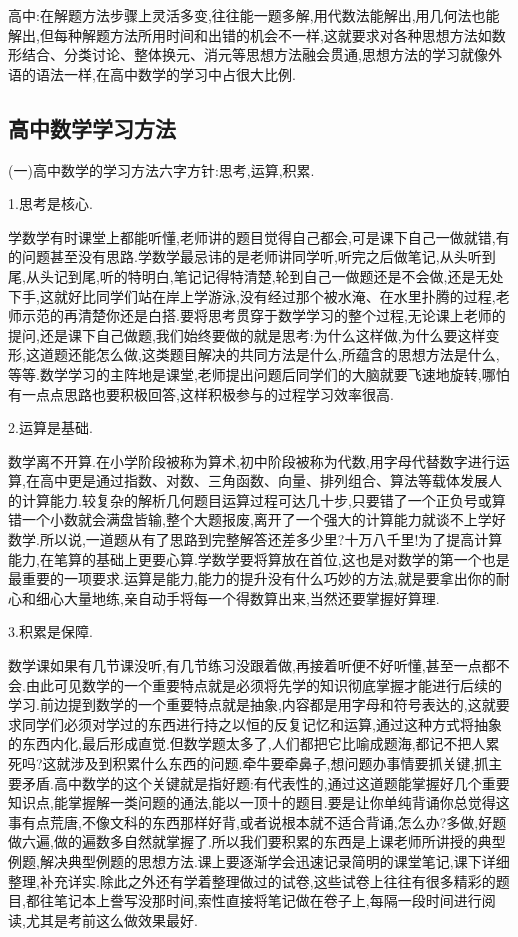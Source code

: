 高中:在解题方法步骤上灵活多变,往往能一题多解,用代数法能解出,用几何法也能解出,但每种解题方法所用时间和出错的机会不一样,这就要求对各种思想方法如数形结合、分类讨论、整体换元、消元等思想方法融会贯通,思想方法的学习就像外语的语法一样,在高中数学的学习中占很大比例.

\subsection{高中数学学习方法}
(一)高中数学的学习方法六字方针:思考,运算,积累.

1.思考是核心.

学数学有时课堂上都能听懂,老师讲的题目觉得自己都会,可是课下自己一做就错,有的问题甚至没有思路.学数学最忌讳的是老师讲同学听,听完之后做笔记,从头听到尾,从头记到尾,听的特明白,笔记记得特清楚,轮到自己一做题还是不会做,还是无处下手,这就好比同学们站在岸上学游泳,没有经过那个被水淹、在水里扑腾的过程,老师示范的再清楚你还是白搭.要将思考贯穿于数学学习的整个过程,无论课上老师的提问,还是课下自己做题,我们始终要做的就是思考:为什么这样做,为什么要这样变形,这道题还能怎么做,这类题目解决的共同方法是什么,所蕴含的思想方法是什么,等等.数学学习的主阵地是课堂,老师提出问题后同学们的大脑就要飞速地旋转,哪怕有一点点思路也要积极回答,这样积极参与的过程学习效率很高.

2.运算是基础.

数学离不开算.在小学阶段被称为算术,初中阶段被称为代数,用字母代替数字进行运算,在高中更是通过指数、对数、三角函数、向量、排列组合、算法等载体发展人的计算能力.较复杂的解析几何题目运算过程可达几十步,只要错了一个正负号或算错一个小数就会满盘皆输,整个大题报废,离开了一个强大的计算能力就谈不上学好数学.所以说,一道题从有了思路到完整解答还差多少里?十万八千里!为了提高计算能力,在笔算的基础上更要心算.学数学要将算放在首位,这也是对数学的第一个也是最重要的一项要求.运算是能力,能力的提升没有什么巧妙的方法,就是要拿出你的耐心和细心大量地练,亲自动手将每一个得数算出来,当然还要掌握好算理.

3.积累是保障.

数学课如果有几节课没听,有几节练习没跟着做,再接着听便不好听懂,甚至一点都不会.由此可见数学的一个重要特点就是必须将先学的知识彻底掌握才能进行后续的学习.前边提到数学的一个重要特点就是抽象,内容都是用字母和符号表达的,这就要求同学们必须对学过的东西进行持之以恒的反复记忆和运算,通过这种方式将抽象的东西内化,最后形成直觉.但数学题太多了,人们都把它比喻成题海,都记不把人累死吗?这就涉及到积累什么东西的问题.牵牛要牵鼻子,想问题办事情要抓关键,抓主要矛盾.高中数学的这个关键就是指好题:有代表性的,通过这道题能掌握好几个重要知识点,能掌握解一类问题的通法,能以一顶十的题目.要是让你单纯背诵你总觉得这事有点荒唐,不像文科的东西那样好背,或者说根本就不适合背诵,怎么办?多做,好题做六遍,做的遍数多自然就掌握了.所以我们要积累的东西是上课老师所讲授的典型例题,解决典型例题的思想方法.课上要逐渐学会迅速记录简明的课堂笔记,课下详细整理,补充详实.除此之外还有学着整理做过的试卷,这些试卷上往往有很多精彩的题目,都往笔记本上誊写没那时间,索性直接将笔记做在卷子上,每隔一段时间进行阅读,尤其是考前这么做效果最好.

